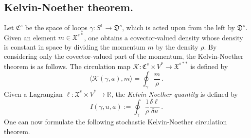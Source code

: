 \documentclass[11pt, oneside]{article}   	%
\numberwithin{equation}{section}
\theoremstyle{plain}
\theoremstyle{definition}
\theoremstyle{remark}
\newcommand{\<}{\langle}
\renewcommand{\>}{\rangle}
\begin{document}
\subsection{Kelvin-Noether theorem.} 
Let $\mathfrak{C}^s$ be the space of loops $\gamma:S^1\to\mathfrak{D}^s$, which is acted upon from the left by $\mathfrak{D}^s$. Given an element $m\in\mathfrak{X}^{s*}$, one obtains a covector-valued density whose density is constant in space by dividing the momentum $m$ by the density $\rho$. By considering only the covector-valued part of the momentum, the Kelvin-Noether theorem is as follows. The circulation map $\mathcal{K}:\mathfrak{C}^s\times V^*\to\mathfrak{X}^{s**}$ is defined by 
\begin{equation}
\langle \mathcal{K}(\gamma,a),m\rangle = \oint_\gamma\frac{m}{\rho}\,.
\end{equation}
Given a Lagrangian $\ell:\mathfrak{X}^s\times V^*\to \mathbb{R}$,  the \emph{Kelvin-Noether quantity} is defined by
\begin{equation}
I(\gamma,u,a) := \oint_\gamma\frac{1}{\rho}\frac{\delta\ell}{\delta u}\,.
\end{equation}
One can now formulate the following stochastic Kelvin-Noether circulation theorem. 
\medskip
\end{document}
